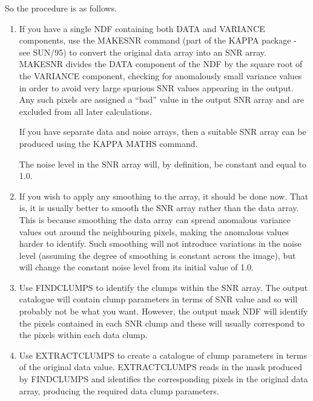 \documentclass[twoside,11pt]{article}
\newcommand{\xref}[3]{#1}
\renewcommand{\_}{\texttt{\symbol{95}}}
\begin{document}
So the procedure is as follows.
\begin{enumerate}

\item If you have a single NDF containing both DATA and VARIANCE
components, use the \xref{MAKESNR}{sun95}{MAKESNR} command (part of the
KAPPA package - see \xref{SUN/95}{sun95}{}) to convert the original data
array into an SNR array. MAKESNR divides the DATA component of the NDF by
the square root of the VARIANCE component, checking for anomalously small
variance values in order to avoid very large spurious SNR values appearing
in the output. Any such pixels are assigned a ``bad'' value in the output
SNR array and are excluded from all later calculations.

If you have separate data and noise arrays, then a suitable SNR array can
be produced using the KAPPA \xref{MATHS}{sun95}{MATHS} command.

The noise level in the SNR array will, by definition, be constant and
equal to 1.0.

\item If you wish to apply any smoothing to the array, it should be done now.
That is, it is usually better to smooth the SNR array rather than the data
array. This is because smoothing the data array can spread anomalous
variance values out around the neighbouring pixels, making the anomalous
values harder to identify. Such smoothing will not introduce variations
in the noise level (assuming the degree of smoothing is constant across
the image), but will change the constant noise level from its initial
value of 1.0.

\item Use FINDCLUMPS to identify the clumps within the SNR array. The
output catalogue will contain clump parameters in terms of SNR value and
so will probably not be what you want. However, the output mask NDF will
identify the pixels contained in each SNR clump and these will usually
correspond to the pixels within each data clump.

\item Use EXTRACTCLUMPS to create a catalogue of clump parameters in
terms of the original data value. EXTRACTCLUMPS reads in the mask produced
by FINDCLUMPS and identifies the corresponding pixels in the original
data array, producing the required data clump parameters.

\end{enumerate}



\newpage
\appendix
\end{document}
